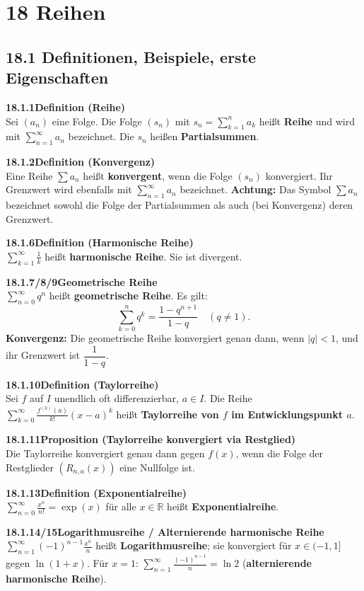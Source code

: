 \documentclass[a4paper,12pt]{article}
\newcommand{\gentry}[3]{%
  \noindent\textbf{#1\quad #2}\nopagebreak\\[0.2em]
  #3\par\smallskip
}
\begin{document}
\section*{18 \quad Reihen}

\subsection*{18.1 \quad Definitionen, Beispiele, erste Eigenschaften}

\gentry{18.1.1}{Definition (Reihe)}{%
  Sei $(a_n)$ eine Folge. Die Folge $(s_n)$ mit $s_n = \sum_{k=1}^n a_k$ heißt
  \textbf{Reihe} und wird mit $\sum_{n=1}^{\infty} a_n$ bezeichnet. Die $s_n$
  heißen \textbf{Partialsummen}.
}

\gentry{18.1.2}{Definition (Konvergenz)}{%
  Eine Reihe $\sum a_n$ heißt \textbf{konvergent}, wenn die Folge $(s_n)$ konvergiert.
  Ihr Grenzwert wird ebenfalls mit $\sum_{n=1}^{\infty} a_n$ bezeichnet.
  \textbf{Achtung:} Das Symbol $\sum a_n$ bezeichnet sowohl die Folge der
  Partialsummen als auch (bei Konvergenz) deren Grenzwert.
}

\gentry{18.1.6}{Definition (Harmonische Reihe)}{%
  $\displaystyle\sum_{k=1}^{\infty} \frac{1}{k}$ heißt \textbf{harmonische Reihe}. Sie ist divergent.
}

\gentry{18.1.7/8/9}{Geometrische Reihe}{%
  $\displaystyle\sum_{n=0}^{\infty} q^n$ heißt \textbf{geometrische Reihe}. Es gilt:
  \[
    \sum_{k=0}^{n} q^k = \frac{1-q^{n+1}}{1-q} \quad (q\ne 1).
  \]
  \textbf{Konvergenz:} Die geometrische Reihe konvergiert genau dann, wenn $|q| < 1$,
  und ihr Grenzwert ist $\dfrac{1}{1-q}$.
}

\gentry{18.1.10}{Definition (Taylorreihe)}{%
  Sei $f$ auf $I$ unendlich oft differenzierbar, $a \in I$. Die Reihe
  $\displaystyle\sum_{k=0}^{\infty} \frac{f^{(k)}(a)}{k!}(x-a)^k$
  heißt \textbf{Taylorreihe von $f$ im Entwicklungspunkt $a$}.
}

\gentry{18.1.11}{Proposition (Taylorreihe konvergiert via Restglied)}{%
  Die Taylorreihe konvergiert genau dann gegen $f(x)$, wenn die Folge der
  Restglieder $(R_{n,a}(x))$ eine Nullfolge ist.
}

\gentry{18.1.13}{Definition (Exponentialreihe)}{%
  $\displaystyle\sum_{n=0}^{\infty} \frac{x^n}{n!} = \exp(x)$ für alle $x \in \mathbb{R}$
  heißt \textbf{Exponentialreihe}.
}

\gentry{18.1.14/15}{Logarithmusreihe / Alternierende harmonische Reihe}{%
  $\displaystyle\sum_{n=1}^{\infty} (-1)^{n-1}\frac{x^n}{n}$ heißt \textbf{Logarithmusreihe};
  sie konvergiert für $x \in (-1,1]$ gegen $\ln(1+x)$.
  Für $x=1$: $\displaystyle\sum_{n=1}^{\infty} \frac{(-1)^{n-1}}{n} = \ln 2$
  (\textbf{alternierende harmonische Reihe}).
}
\end{document}
